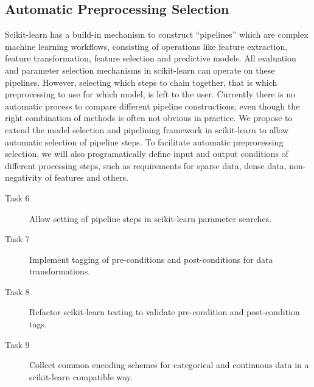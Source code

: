 \subsection{Automatic Preprocessing Selection}
Scikit-learn has a build-in mechanism to construct ``pipelines'' which are complex 
machine learning workflows, consisting of operations like feature extraction,
feature transformation, feature selection and predictive models.
All evaluation and parameter selection mechanisms in scikit-learn can operate
on these pipelines.
However, selecting which steps to chain together, that is which preprocessing
to use for which model, is left to the user. Currently there is no
automatic process to compare different pipeline constructions, even though
the right combination of methods is often not obvious in practice.
We propose to extend the model selection and pipelining framework in scikit-learn
to allow automatic selection of pipeline steps.
To facilitate automatic preprocessing selection, we will also programatically
define input and output conditions of different processing steps, such
as requirements for sparse data, dense data, non-negativity of features and others.
\begin{description}
    \item [Task 6] Allow setting of pipeline steps in scikit-learn parameter searches.
    \item [Task 7] Implement tagging of pre-conditions and post-conditions for data transformations.
    \item [Task 8] Refactor scikit-learn testing to validate pre-condition and post-condition tags.
    \item [Task 9] Collect common encoding schemes for categorical and
        continuous data in a scikit-learn compatible way.
\end{description}

